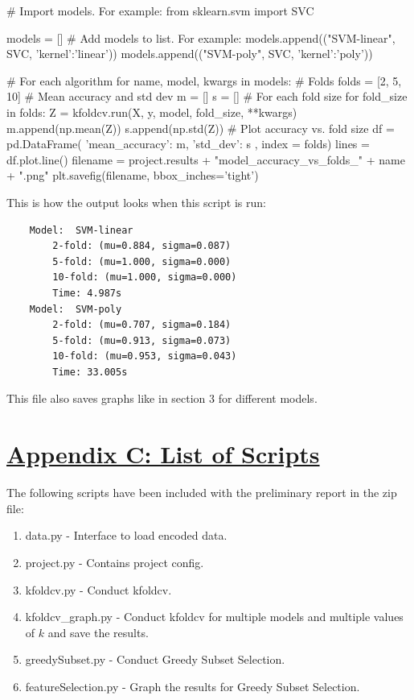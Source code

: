 \documentclass[fleqn]{article}
\begin{document}
    \begin{python}
# Import models. For example:
from sklearn.svm import SVC

models = []
# Add models to list. For example:
models.append(("SVM-linear", SVC, {'kernel':'linear'}))
models.append(("SVM-poly", SVC, {'kernel':'poly'}))

# For each algorithm
for name, model, kwargs in models:
    # Folds
    folds = [2, 5, 10]
    # Mean accuracy and std dev
    m = []
    s = []
    # For each fold size
    for fold_size in folds:
        Z = kfoldcv.run(X, y, model, fold_size, **kwargs)
        m.append(np.mean(Z))
        s.append(np.std(Z))
    # Plot accuracy vs. fold size
    df = pd.DataFrame({
        'mean_accuracy': m,
        'std_dev': s
    }, index = folds)
    lines = df.plot.line()
    filename = project.results + "model_accuracy_vs_folds_" + name + ".png"
    plt.savefig(filename, bbox_inches='tight')
    \end{python}
    \noindent
    This is how the output looks when this script is run:
    \begin{lstlisting}
    Model:	SVM-linear
        2-fold: (mu=0.884, sigma=0.087)
        5-fold: (mu=1.000, sigma=0.000)
        10-fold: (mu=1.000, sigma=0.000)
        Time: 4.987s
    Model:	SVM-poly
        2-fold: (mu=0.707, sigma=0.184)
        5-fold: (mu=0.913, sigma=0.073)
        10-fold: (mu=0.953, sigma=0.043)
        Time: 33.005s
    \end{lstlisting}
    \noindent
    This file also saves graphs like in section 3 for different models.

    \newpage
    \section*{\underline{Appendix C: List of Scripts}}
    The following scripts have been included with the preliminary report in the zip file:
    \begin{enumerate}
        \item data.py - Interface to load encoded data.
        \item project.py - Contains project config.
        \item kfoldcv.py - Conduct kfoldcv.
        \item kfoldcv\_graph.py - Conduct kfoldcv for multiple models and multiple values
        of $k$ and save the results.
        \item greedySubset.py - Conduct Greedy Subset Selection.
        \item featureSelection.py - Graph the results for Greedy Subset Selection.
    \end{enumerate}
\end{document}
